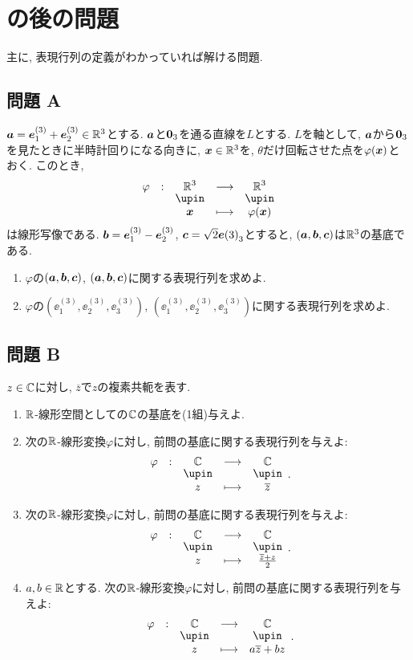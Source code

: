 \section{の後の問題}
主に, 表現行列の定義がわかっていれば解ける問題.

\subsection{問題 A}
\begin{quiz}
  $\boldsymbol{a}=\boldsymbol{e}^{(3)}_1+\boldsymbol{e}^{(3)}_2\in\mathbb{R}^3$とする.
  $\boldsymbol{a}$と$\boldsymbol{0}_3$を通る直線を$L$とする.
  $L$を軸として, $\boldsymbol{a}$から$\boldsymbol{0}_3$を見たときに半時計回りになる向きに,
  $\boldsymbol{x}\in\mathbb{R}^3$を, $\theta$だけ回転させた点を$\varphi(\boldsymbol{x})$とおく.
  このとき,
  \begin{align*}
    \shazo{\varphi}{\RR^3}{\RR^3}{\xx}{\varphi(\xx)}
  \end{align*}
  は線形写像である.
  $\boldsymbol{b}=\boldsymbol{e}^{(3)}_1-\boldsymbol{e}^{(3)}_2$,
  $\boldsymbol{c}=\sqrt{2}\boldsymbol{e}{(3)}_3$とすると,
  $(\boldsymbol{a},\boldsymbol{b},\boldsymbol{c})$は$\mathbb{R}^3$の基底である.
  \begin{enumerate}
    \item $\varphi$の$(\boldsymbol{a},\boldsymbol{b},\boldsymbol{c})$, $(\boldsymbol{a},\boldsymbol{b},\boldsymbol{c})$に関する表現行列を求めよ.
    \item $\varphi$の$(\ee^{(3)}_1,\ee^{(3)}_2,\ee^{(3)}_3)$, $(\ee^{(3)}_1,\ee^{(3)}_2,\ee^{(3)}_3)$に関する表現行列を求めよ.
  \end{enumerate}
\end{quiz}
\subsection{問題 B}
\begin{quiz}
  $z\in\mathbb{C}$に対し, $\overline z$で$z$の複素共軛を表す.
  \begin{enumerate}
  \item $\mathbb{R}$-線形空間としての$\mathbb{C}$の基底を(1組)与えよ.
  \item 次の$\mathbb{R}$-線形変換$\varphi$に対し, 前問の基底に関する表現行列を与えよ:
    \begin{align*}
      \shazo{\varphi}{\CC}{\CC}
      {z}{\overline{z}}.
    \end{align*}
  \item 次の$\mathbb{R}$-線形変換$\varphi$に対し, 前問の基底に関する表現行列を与えよ:
    \begin{align*}
      \shazo{\varphi}{\CC}{\CC}
      {z}{\frac{\overline{z}+z}{2}}.
    \end{align*}
  \item $a,b\in\mathbb{R}$とする.
    次の$\mathbb{R}$-線形変換$\varphi$に対し, 前問の基底に関する表現行列を与えよ:
    \begin{align*}
      \shazo{\varphi}{\CC}{\CC}
      {z}{a\overline{z}+bz}.
    \end{align*}
  \end{enumerate}
\end{quiz}

